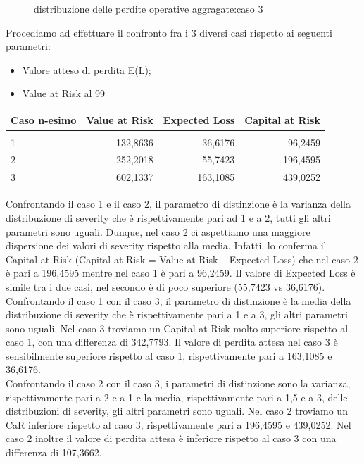 \documentclass[titlepage]{article}
\begin{document}
\begin{itemize}
\begin{figure}[htbp]
	\caption{\label{fig:losss.png}distribuzione delle perdite operative aggragate:caso 3}
\end{figure}
Procediamo ad effettuare il confronto fra i 3 diversi casi rispetto ai seguenti parametri:
\begin{itemize}
\item 	Valore atteso di perdita E(L);
\item 	Value at Risk al 99%
\end{itemize}
\begin{table}[htbp]
	\centering
	\begin{tabular}{l|rrr}
		Caso n-esimo & Value at Risk & Expected Loss& Capital at Risk \\\hline
		\\
		1 & 132,8636&36,6176&96,2459 \\
		2 & 252,2018 &55,7423&196,4595\\
		3 & 602,1337 &163,1085&439,0252
	\end{tabular}
\end{table}
Confrontando il caso 1 e il caso 2, il parametro di distinzione è la varianza della distribuzione di severity che è rispettivamente pari ad 1 e a 2, tutti gli altri parametri sono uguali. Dunque, nel caso 2 ci aspettiamo una maggiore dispersione dei valori di severity rispetto alla media. Infatti, lo conferma il Capital at Risk (Capital at Risk = Value at Risk – Expected Loss) che nel caso 2 è pari a 196,4595 mentre nel caso 1 è pari a 96,2459. Il valore di Expected Loss è simile tra i due casi, nel secondo è di poco superiore (55,7423 vs 36,6176).
\\
Confrontando il caso 1 con il caso 3, il parametro di distinzione è la media della distribuzione di severity che è rispettivamente pari a 1 e a 3, gli altri parametri sono uguali. Nel caso 3 troviamo un Capital at Risk molto superiore rispetto al caso 1, con una differenza di 342,7793. Il valore di perdita attesa nel caso 3 è sensibilmente superiore rispetto al caso 1, rispettivamente pari a 163,1085 e 36,6176.
\\
Confrontando il caso 2 con il caso 3, i parametri di distinzione sono la varianza, rispettivamente pari a 2 e a 1 e la media, rispettivamente pari a 1,5 e a 3, delle distribuzioni di severity, gli altri parametri sono uguali. Nel caso 2 troviamo un CaR inferiore rispetto al caso 3, rispettivamente pari a 196,4595 e 439,0252. Nel caso 2 inoltre il valore di perdita attesa è inferiore rispetto al caso 3 con una differenza di 107,3662.
\\

\end{itemize}
\end{document}
